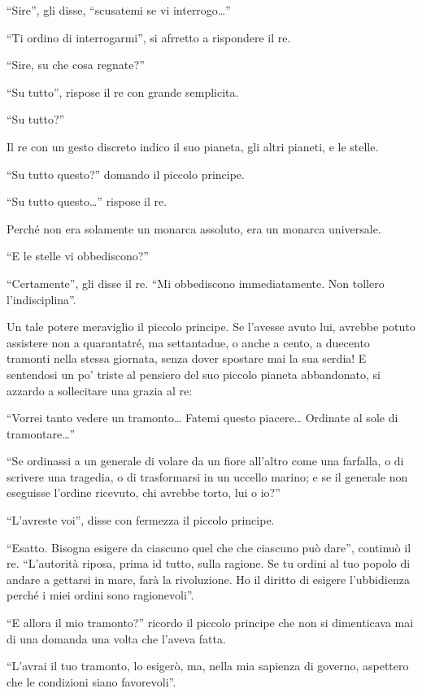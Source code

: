 \documentclass[11pt]{scrbook}
\begin{document}
``Sire'', gli disse, ``scusatemi se vi interrogo\ldots{}''

``Ti ordino di interrogarmi'', si afrretto a rispondere il re.

``Sire, su che cosa regnate?''

``Su tutto'', rispose il re con grande semplicita.

``Su tutto?''

Il re con un gesto discreto indico il suo pianeta, gli altri pianeti, e
le stelle.

``Su tutto questo?'' domando il piccolo principe.

``Su tutto questo\ldots{}'' rispose il re.

Perché non era solamente un monarca assoluto, era un monarca universale.

``E le stelle vi obbediscono?''

``Certamente'', gli disse il re. ``Mi obbediscono immediatamente. Non
tollero l'indisciplina''.

Un tale potere meraviglio il piccolo principe. Se l'avesse avuto lui,
avrebbe potuto assistere non a quarantatré, ma settantadue, o anche a
cento, a duecento tramonti nella stessa giornata, senza dover spostare
mai la sua serdia! E sentendosi un po' triste al pensiero del suo
piccolo pianeta abbandonato, si azzardo a sollecitare una grazia al re:

``Vorrei tanto vedere un tramonto\ldots{} Fatemi questo piacere\ldots{}
Ordinate al sole di tramontare\ldots{}''

``Se ordinassi a un generale di volare da un fiore all'altro come una
farfalla, o di scrivere una tragedia, o di trasformarsi in un uccello
marino; e se il generale non eseguisse l'ordine ricevuto, chi avrebbe
torto, lui o io?''

``L'avreste voi'', disse con fermezza il piccolo principe.

``Esatto. Bisogna esigere da ciascuno quel che che ciascuno può dare'',
continuò il re. ``L'autorità riposa, prima id tutto, sulla ragione. Se
tu ordini al tuo popolo di andare a gettarsi in mare, farà la
rivoluzione. Ho il diritto di esigere l'ubbidienza perché i miei ordini
sono ragionevoli''.

``E allora il mio tramonto?'' ricordo il piccolo principe che non si
dimenticava mai di una domanda una volta che l'aveva fatta.

``L'avrai il tuo tramonto, lo esigerò, ma, nella mia sapienza di
governo, aspettero che le condizioni siano favorevoli''.
\end{document}
